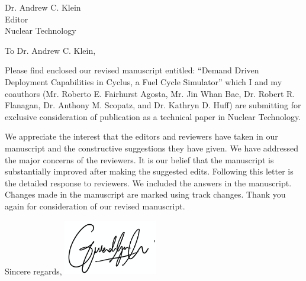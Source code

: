 \documentclass[11pt]{letter} %
\newcommand{\RecipientName}{Dr. Andrew C. Klein\xspace}
\newcommand{\RecipientAddress}{Editor\\Nuclear Technology}
\begin{document}
\small
\begin{letter}{\RecipientName\\
        \RecipientAddress\xspace}

\address{Gwendolyn J. Chee\\
gchee2@illinois.edu\\
226 Talbot Laboratory\\
104 Wright Street, MC-234\\
Urbana, IL 61801}


\opening{To \RecipientName,}

Please find enclosed our revised manuscript entitled: ``Demand Driven Deployment Capabilities in Cyclus, 
a Fuel Cycle Simulator'' which I and my 
coauthors (Mr. Roberto E. Fairhurst Agosta, Mr. Jin Whan Bae, 
Dr. Robert R. Flanagan, Dr. Anthony M. Scopatz, and Dr. Kathryn D. Huff) are submitting for 
exclusive consideration of publication as a technical paper in Nuclear Technology. 

We appreciate the interest that the editors and reviewers have taken in our manuscript and the
constructive suggestions they have given. We have addressed the major concerns of the reviewers.
It is our belief that the manuscript is substantially improved after making the suggested edits.
Following this letter is the detailed response to reviewers. We included the answers in the manuscript.
Changes made in the manuscript are marked using track changes.
Thank you again for consideration of our revised manuscript.


\closing{Sincere regards,
\includegraphics[height=2.4cm]{sign}\\
}


\end{letter}
\end{document}
